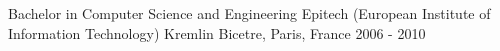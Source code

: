 

\begin{cventries}


  \cventry
    {Bachelor in Computer Science and Engineering} %
    {Epitech (European Institute of Information Technology)} %
    {Kremlin Bicetre, Paris, France} %
    {2006 - 2010} %
    {
      \begin{cvitems} %
      \end{cvitems}
    }

\end{cventries}

